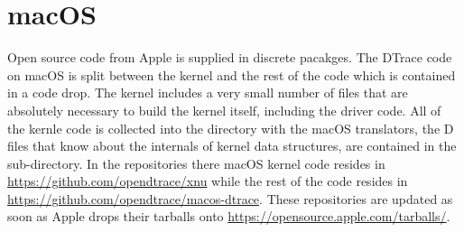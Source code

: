 \section{macOS}
\label{sec:macos-code}

Open source code from Apple is supplied in discrete pacakges.  The
DTrace code on macOS is split between the  kernel and
the rest of the code which is contained in a  code
drop.  The kernel includes a very small number of files that are
absolutely necessary to build the kernel itself, including the driver
code.  All of the kernle code is collected into the
 directory with the macOS translators,
the D files that know about the internals of kernel data structures,
are contained in the  sub-directory.  In the
 repositories there macOS kernel code resides in
\url{https://github.com/opendtrace/xnu} while the rest of the code
resides in \url{https://github.com/opendtrace/macos-dtrace}.  These
repositories are updated as soon as Apple drops their tarballs onto
\url{https://opensource.apple.com/tarballs/}.

